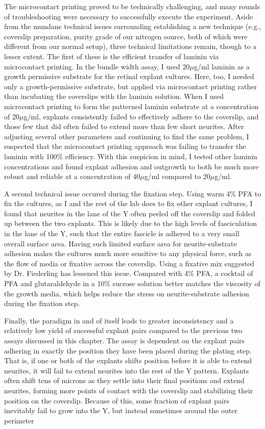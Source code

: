 The microcontact printing proved to be technically challenging, and many rounds of troubleshooting were necessary to successfully execute the experiment.
Aside from the mundane technical issues surrounding establishing a new technique (e.g., coverslip preparation, purity grade of our nitrogen source, both of which were different from our normal setup), three technical limitations remain, though to a lesser extent.
The first of these is the efficient transfer of laminin via microcontact printing.
In the bundle width assay, I used 20$\mu$g/ml laminin as a growth permissive substrate for the retinal explant cultures.
Here, too, I needed only a growth-permissive substrate, but applied via microcontact printing rather than incubating the coverslips with the laminin solution.
When I used microcontact printing to form the patterned laminin substrate at a concentration of 20$\mu$g/ml, explants consistently failed to effectively adhere to the coverslip, and those few that did often failed to extend more than few short neurites.
After adjusting several other parameters and continuing to find the same problem, I suspected that the microcontact printing approach was failing to transfer the laminin with 100\% efficiency.
With this suspicion in mind, I tested other laminin concentrations and found explant adhesion and outgrowth to both be much more robust and reliable at a concentration of 40$\mu$g/ml compared to 20$\mu$g/ml.

A second technical issue occured during the fixation step.
Using warm 4\% PFA to fix the cultures, as I and the rest of the lab does to fix other explant cultures, I found that neurites in the lane of the Y often peeled off the coverslip and folded up between the two explants.
This is likely due to the high levels of fasciculation in the lane of the Y, such that the entire fascicle is adhered to a very small overall surface area.
Having such limited surface area for neurite-substrate adhesion makes the cultures much more sensitive to any physical force, such as the flow of media or fixative across the coverslip.
Using a fixative mix suggested by Dr. Fiederling has lessened this issue.
Compared with 4\% PFA, a cocktail of PFA and glutaraldehyde in a 10\% sucrose solution better matches the viscosity of the growth media, which helps reduce the stress on neurite-substrate adhesion during the fixation step.

Finally, the paradigm in and of itself leads to greater inconsistency and a relatively low yield of successful explant pairs compared to the previous two assays discussed in this chapter.
The assay is dependent on the explant pairs adhering in exactly the position they have been placed during the plating step.
That is, if one or both of the explants shifts position before it is able to extend neurites, it will fail to extend neurites into the rest of the Y pattern.
Explants often shift tens of microns as they settle into their final positions and extend neurites, forming more points of contact with the coverslip and stabilizing their position on the coverslip.
Because of this, some fraction of explant pairs inevitably fail to grow into the Y, but instead sometimes around the outer perimeter

